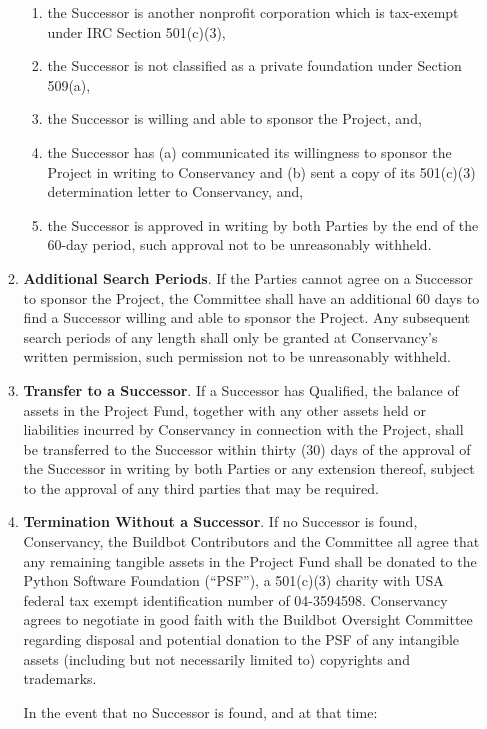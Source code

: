\documentclass[letterpaper,12pt]{article}
\begin{document}
\begin{enumerate}[label=\arabic*.,ref=\S~\arabic*]
\begin{enumerate}[label=\alph*.,ref=\theenumi(\arabic*)]
    \begin{enumerate}[label=\roman*.,ref=\theenumi(\alph{enumii})(\roman*)]
\item the Successor is another nonprofit corporation which is tax-exempt
under IRC Section 501(c)(3), 
\item the Successor is not classified as a private foundation under Section
509(a), 
\item the Successor is willing and able to sponsor the Project, and, 
\item the Successor has (a) communicated its willingness to sponsor the
  Project in writing to Conservancy and (b) sent a copy of its 501(c)(3) determination letter to Conservancy, and, 
\item the Successor is approved in writing by both Parties by the end of
the 60-day period, such approval not to be unreasonably withheld. 
\end{enumerate}
\item \textbf{Additional Search Periods}. If the Parties cannot agree on
a Successor to sponsor the Project, the Committee
shall have an additional 60 days to find a Successor willing and able
to sponsor the Project. Any subsequent search periods of any length
shall only be granted at Conservancy's written permission, such permission 
not to be unreasonably withheld. 
\item \textbf{Transfer to a Successor}. If a Successor has Qualified, the balance
of assets in the Project Fund, together with any other assets held
or liabilities incurred by Conservancy in connection with the
Project, shall be transferred to the Successor within thirty (30)
days of the approval of the Successor in writing by both Parties or
any extension thereof, subject to the approval of any third parties
that may be required.
\item \textbf{Termination Without a Successor}. If no Successor is found,
  Conservancy, the Buildbot Contributors and the Committee all agree
  that any remaining tangible assets in the Project Fund shall be donated to
  the Python Software Foundation (``PSF''), a 501(c)(3) charity with USA
  federal tax exempt identification number of 04-3594598.  Conservancy agrees to
  negotiate in good faith with the Buildbot Oversight Committee regarding
  disposal and potential donation to the PSF of any intangible assets
  (including but not necessarily limited to) copyrights and trademarks.

In the event that no Successor is found, and at that time:


\end{enumerate}
\end{enumerate}
\end{document}
